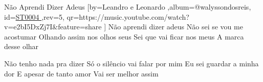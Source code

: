 \beginsong
{Não Aprendi Dizer Adeus %
}[by={Leandro e Leonardo %
},album={@walyssondosreis},
id={\href{https://music.youtube.com/watch?v=e2bI5DxZj7I&feature=share %
}{ST0004 %
}},rev={5}, %
qr={https://music.youtube.com/watch?v=e2bI5DxZj7I&feature=share %
}]
\beginverse
Não aprendi dizer adeus
Não sei se vou me acostumar
Olhando assim nos olhos seus
Sei que vai ficar nos meus
A marca desse olhar
\endverse

\beginverse
Não tenho nada pra dizer
Só o silêncio vai falar por mim
Eu sei guardar a minha dor
E apesar de tanto amor
Vai ser melhor assim
\endverse

